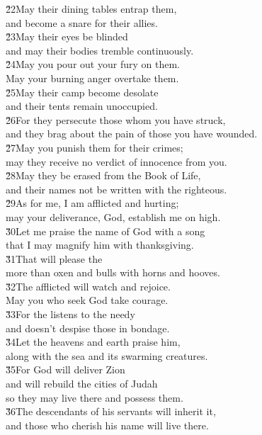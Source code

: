 \begin{poetry}
\poeml \v{22}May their dining tables entrap them, \\
\poemll    and become a snare for their allies. \\
\poeml \v{23}May their eyes be blinded \\
\poemll    and may their bodies tremble continuously. \\
\poeml \v{24}May you pour out your fury on them. \\
\poemll    May your burning anger overtake them. \\
\poeml \v{25}May their camp become desolate \\
\poemll    and their tents remain unoccupied. \\
\poeml \v{26}For they persecute those whom you have struck, \\
\poemll    and they brag about the pain of those you have wounded. \\
\poeml \v{27}May you punish them for their crimes; \\
\poemll    may they receive no verdict of innocence from you. \\
\poeml \v{28}May they be erased from the Book of Life, \\
\poemll    and their names not be written with the righteous. \\
\poeml \v{29}As for me, I am afflicted and hurting; \\
\poemll    may your deliverance, God, establish me on high. \\
\poeml \v{30}Let me praise the name of God with a song \\
\poemll    that I may magnify him with thanksgiving. \\
\poeml \v{31}That will please the  \\
\poemll    more than oxen and bulls with horns and hooves. \\
\poeml \v{32}The afflicted will watch and rejoice. \\
\poemll    May you who seek God take courage. \\
\poeml \v{33}For the  listens to the needy \\
\poemll    and doesn't despise those in bondage. \\
\poeml \v{34}Let the heavens and earth praise him, \\
\poemll    along with the sea and its swarming creatures. \\
\poeml \v{35}For God will deliver Zion \\
\poemll    and will rebuild the cities of Judah \\
\poemlll       so they may live there and possess them. \\
\poeml \v{36}The descendants of his servants will inherit it, \\
\poemll    and those who cherish his name will live there.
\end{poetry}

